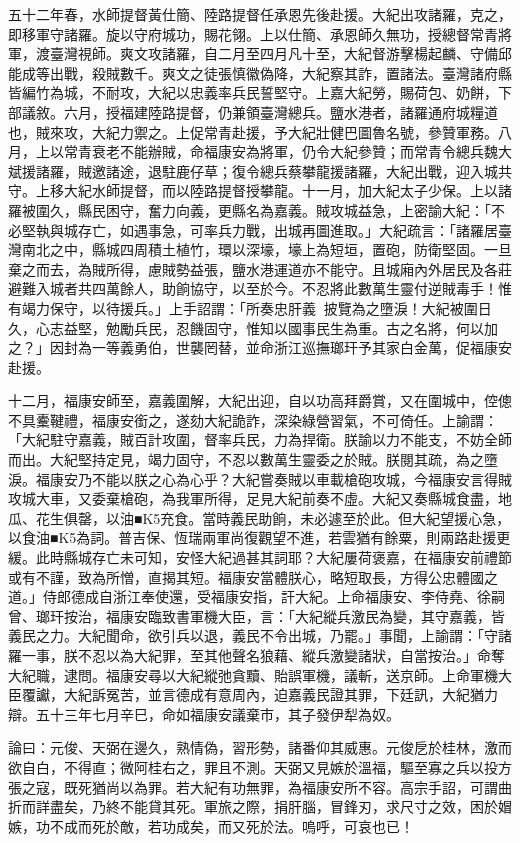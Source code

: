 \begin{pinyinscope}
五十二年春，水師提督黃仕簡、陸路提督任承恩先後赴援。大紀出攻諸羅，克之，即移軍守諸羅。旋以守府城功，賜花翎。上以仕簡、承恩師久無功，授總督常青將軍，渡臺灣視師。爽文攻諸羅，自二月至四月凡十至，大紀督游擊楊起麟、守備邱能成等出戰，殺賊數千。爽文之徒張慎徽偽降，大紀察其詐，置諸法。臺灣諸府縣皆編竹為城，不耐攻，大紀以忠義率兵民誓堅守。上嘉大紀勞，賜荷包、奶餅，下部議敘。六月，授福建陸路提督，仍兼領臺灣總兵。鹽水港者，諸羅通府城糧道也，賊來攻，大紀力禦之。上促常青赴援，予大紀壯健巴圖魯名號，參贊軍務。八月，上以常青衰老不能辦賊，命福康安為將軍，仍令大紀參贊；而常青令總兵魏大斌援諸羅，賊邀諸途，退駐鹿仔草；復令總兵蔡攀龍援諸羅，大紀出戰，迎入城共守。上移大紀水師提督，而以陸路提督授攀龍。十一月，加大紀太子少保。上以諸羅被圍久，縣民困守，奮力向義，更縣名為嘉義。賊攻城益急，上密諭大紀：「不必堅執與城存亡，如遇事急，可率兵力戰，出城再圖進取。」大紀疏言：「諸羅居臺灣南北之中，縣城四周積土植竹，環以深壕，壕上為短垣，置砲，防衛堅固。一旦棄之而去，為賊所得，慮賊勢益張，鹽水港運道亦不能守。且城廂內外居民及各莊避難入城者共四萬餘人，助餉協守，以至於今。不忍將此數萬生靈付逆賊毒手！惟有竭力保守，以待援兵。」上手詔謂：「所奏忠肝義，披覽為之墮淚！大紀被圍日久，心志益堅，勉勵兵民，忍饑固守，惟知以國事民生為重。古之名將，何以加之？」因封為一等義勇伯，世襲罔替，並命浙江巡撫瑯玕予其家白金萬，促福康安赴援。

十二月，福康安師至，嘉義圍解，大紀出迎，自以功高拜爵賞，又在圍城中，倥傯不具櫜鞬禮，福康安銜之，遂劾大紀詭詐，深染綠營習氣，不可倚任。上諭謂：「大紀駐守嘉義，賊百計攻圍，督率兵民，力為捍衛。朕諭以力不能支，不妨全師而出。大紀堅持定見，竭力固守，不忍以數萬生靈委之於賊。朕閱其疏，為之墮淚。福康安乃不能以朕之心為心乎？大紀嘗奏賊以車載槍砲攻城，今福康安言得賊攻城大車，又委棄槍砲，為我軍所得，足見大紀前奏不虛。大紀又奏縣城食盡，地瓜、花生俱罄，以油■K5充食。當時義民助餉，未必遽至於此。但大紀望援心急，以食油■K5為詞。普吉保、恆瑞兩軍尚復觀望不進，若雲猶有餘粟，則兩路赴援更緩。此時縣城存亡未可知，安怪大紀過甚其詞耶？大紀屢荷褒嘉，在福康安前禮節或有不謹，致為所憎，直揭其短。福康安當體朕心，略短取長，方得公忠體國之道。」侍郎德成自浙江奉使還，受福康安指，訐大紀。上命福康安、李侍堯、徐嗣曾、瑯玕按治，福康安臨致書軍機大臣，言：「大紀縱兵激民為變，其守嘉義，皆義民之力。大紀聞命，欲引兵以退，義民不令出城，乃罷。」事聞，上諭謂：「守諸羅一事，朕不忍以為大紀罪，至其他聲名狼藉、縱兵激變諸狀，自當按治。」命奪大紀職，逮問。福康安尋以大紀縱弛貪黷、貽誤軍機，議斬，送京師。上命軍機大臣覆讞，大紀訴冤苦，並言德成有意周內，迫嘉義民證其罪，下廷訊，大紀猶力辯。五十三年七月辛巳，命如福康安議棄市，其子發伊犁為奴。

論曰：元俊、天弼在邊久，熟情偽，習形勢，諸番仰其威惠。元俊戹於桂林，激而欲自白，不得直；微阿桂右之，罪且不測。天弼又見嫉於溫福，驅至寡之兵以投方張之寇，既死猶尚以為罪。若大紀有功無罪，為福康安所不容。高宗手詔，可謂曲折而詳盡矣，乃終不能貸其死。軍旅之際，捐肝腦，冒鋒刃，求尺寸之效，困於媢嫉，功不成而死於敵，若功成矣，而又死於法。嗚呼，可哀也已！


\end{pinyinscope}